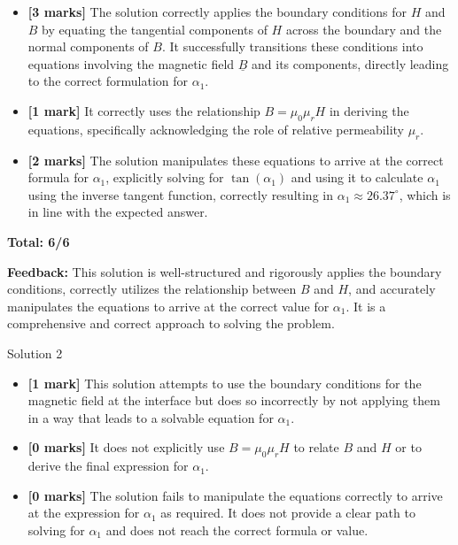 \documentclass[a4paper,11pt]{article}
\begin{document}
\begin{itemize}
    \item \textbf{[3 marks]} The solution correctly applies the boundary conditions for \( H \) and \( B \) by equating the tangential components of \( H \) across the boundary and the normal components of \( B \). It successfully transitions these conditions into equations involving the magnetic field \( \underline{B} \) and its components, directly leading to the correct formulation for \( \alpha_1 \).
    \item \textbf{[1 mark]} It correctly uses the relationship \( B = \mu_0 \mu_r H \) in deriving the equations, specifically acknowledging the role of relative permeability \( \mu_r \).
    \item \textbf{[2 marks]} The solution manipulates these equations to arrive at the correct formula for \( \alpha_1 \), explicitly solving for \( \tan(\alpha_1) \) and using it to calculate \( \alpha_1 \) using the inverse tangent function, correctly resulting in \( \alpha_1 \approx 26.37^\circ \), which is in line with the expected answer.
\end{itemize}

\textbf{Total: 6/6}

\textbf{Feedback:} This solution is well-structured and rigorously applies the boundary conditions, correctly utilizes the relationship between \( B \) and \( H \), and accurately manipulates the equations to arrive at the correct value for \( \alpha_1 \). It is a comprehensive and correct approach to solving the problem.

Solution 2

\begin{itemize}
    \item \textbf{[1 mark]} This solution attempts to use the boundary conditions for the magnetic field at the interface but does so incorrectly by not applying them in a way that leads to a solvable equation for \( \alpha_1 \).
    \item \textbf{[0 marks]} It does not explicitly use \( B = \mu_0 \mu_r H \) to relate \( B \) and \( H \) or to derive the final expression for \( \alpha_1 \).
    \item \textbf{[0 marks]} The solution fails to manipulate the equations correctly to arrive at the expression for \( \alpha_1 \) as required. It does not provide a clear path to solving for \( \alpha_1 \) and does not reach the correct formula or value.
\end{itemize}
\end{document}
